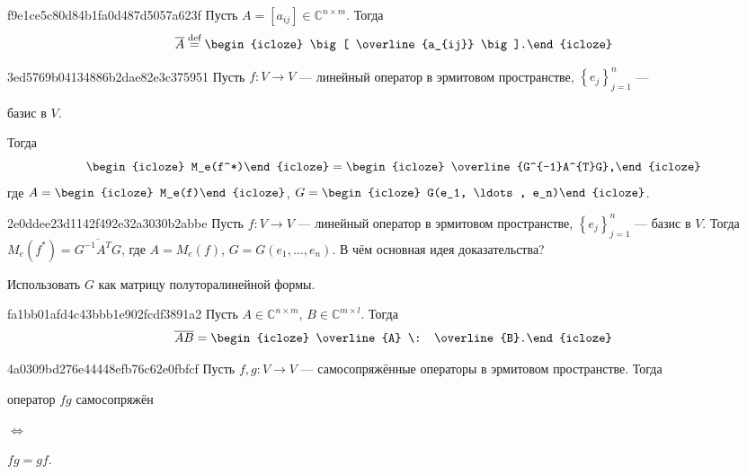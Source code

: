 \begin{note}{f9e1ce5c80d84b1fa0d487d5057a623f}
    Пусть \({ A = [a_{ij}] \in \mathbb C^{n \times m} }\).
    Тогда
    \[
        \overline{A} \overset{\text{def}}= \begin{icloze}{1}\big[ \overline{a_{ij}} \big].\end{icloze}
    \]
\end{note}

\begin{note}{3ed5769b04134886b2dae82e3c375951}
    Пусть \({ f : V \to V }\) --- линейный оператор в эрмитовом пространстве,\: \({ \left\{ e_j \right\}_{j = 1}^{n} }\) --- \begin{icloze}{4}базис в \({ V }\).\end{icloze}
    Тогда
    \[
        \begin{icloze}{5}M_e(f^*)\end{icloze} = \begin{icloze}{1}\overline{G^{-1}A^{T}G},\end{icloze}
    \]
    где \({ A = \begin{icloze}{2}M_e(f)\end{icloze} }\),\: \({ G = \begin{icloze}{3}G(e_1, \ldots, e_n)\end{icloze} }\).
\end{note}

\begin{note}{2e0ddee23d1142f492e32a3030b2abbe}
    Пусть \({ f : V \to V }\) --- линейный оператор в эрмитовом пространстве,\: \({ \left\{ e_j \right\}_{j = 1}^{n} }\) --- базис в \({ V }\).
    Тогда \({ M_e(f^*) = \overline{G^{-1}A^{T}G} }\), где \({ A = M_e(f) }\),\: \({ G = G(e_1, \ldots, e_n) }\).
    В чём основная идея доказательства?

    \begin{cloze}{1}
        Использовать \({ G }\) как матрицу полуторалинейной формы.
    \end{cloze}
\end{note}

\begin{note}{fa1bb01afd4c43bbb1e902fcdf3891a2}
    Пусть \({ A \in \mathbb C^{n \times m} }\),\: \({ B \in \mathbb C^{m \times l} }\).
    Тогда
    \[
        \overline{AB} = \begin{icloze}{1}\overline{A} \: \overline{B}.\end{icloze}
    \]
\end{note}

\begin{note}{4a0309bd276e44448efb76c62e0fbfcf}
    Пусть \({ f, g : V \to V }\) --- самосопряжённые операторы в эрмитовом пространстве.
    Тогда \begin{icloze}{2}оператор \({ fg }\) самосопряжён\end{icloze} \begin{icloze}{3}\({ \iff }\)\end{icloze} \begin{icloze}{1}\({ fg = gf }\).\end{icloze}
\end{note}

